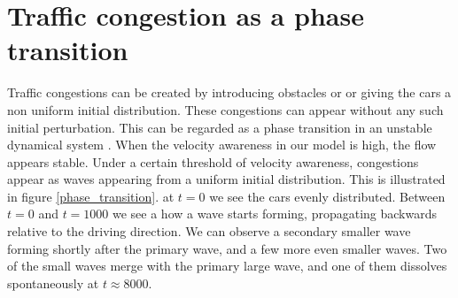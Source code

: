 \documentclass[11pt,a4paper,twocolumn]{article}
\begin{document}
\section{Traffic congestion as a phase transition}
Traffic congestions can be created by introducing obstacles or or giving the cars a non uniform initial distribution. These congestions can appear without any such initial perturbation. This can be regarded as a phase transition in an unstable dynamical system \cite{bando1995dynamical}. When the velocity awareness in our model is high, the flow appears stable. Under a certain threshold of velocity awareness, congestions appear as waves appearing from a uniform initial distribution. This is illustrated in figure \ref{phase_transition}. at $t=0$ we see the cars evenly distributed. Between $t=0$ and $t=1000$ we see a how a wave starts forming, propagating backwards relative to the driving direction. We can observe a secondary smaller wave forming shortly after the primary wave, and a few more even smaller waves. Two of the small waves merge with the primary large wave, and one of them dissolves spontaneously at $t \approx 8000$. 







\end{document}
